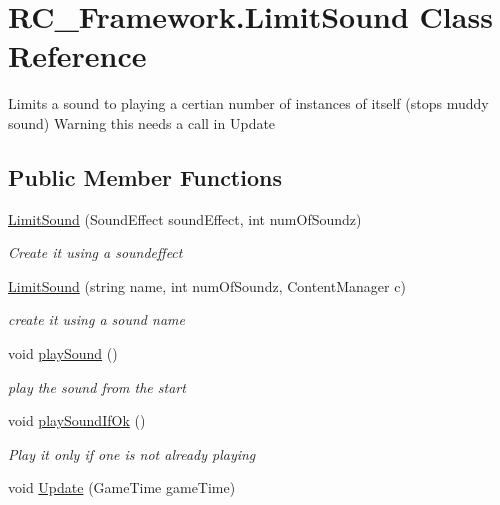 \hypertarget{class_r_c___framework_1_1_limit_sound}{}\section{R\+C\+\_\+\+Framework.\+Limit\+Sound Class Reference}
\label{class_r_c___framework_1_1_limit_sound}


Limits a sound to playing a certian number of instances of itself (stops muddy sound) Warning this needs a call in Update  


\subsection*{Public Member Functions}
\begin{DoxyCompactItemize}
\item 
\mbox{\hyperlink{class_r_c___framework_1_1_limit_sound_a9cbeff174c2bb2fcaac7787b744feed8}{Limit\+Sound}} (Sound\+Effect sound\+Effect, int num\+Of\+Soundz)
\begin{DoxyCompactList}\small\item\em Create it using a soundeffect \end{DoxyCompactList}\item 
\mbox{\hyperlink{class_r_c___framework_1_1_limit_sound_a44dfcf8fbf1e0ba71457097f7f32176e}{Limit\+Sound}} (string name, int num\+Of\+Soundz, Content\+Manager c)
\begin{DoxyCompactList}\small\item\em create it using a sound name \end{DoxyCompactList}\item 
void \mbox{\hyperlink{class_r_c___framework_1_1_limit_sound_a17847d5b1d8c9c55b66a274e0e7e22cc}{play\+Sound}} ()
\begin{DoxyCompactList}\small\item\em play the sound from the start \end{DoxyCompactList}\item 
void \mbox{\hyperlink{class_r_c___framework_1_1_limit_sound_a0d63e6c2b23828bf2b570c55f2fa396a}{play\+Sound\+If\+Ok}} ()
\begin{DoxyCompactList}\small\item\em Play it only if one is not already playing \end{DoxyCompactList}\item 
void \mbox{\hyperlink{class_r_c___framework_1_1_limit_sound_a9d6eda93ccf422244fbe7a9ca2a19f13}{Update}} (Game\+Time game\+Time)
\end{DoxyCompactItemize}



